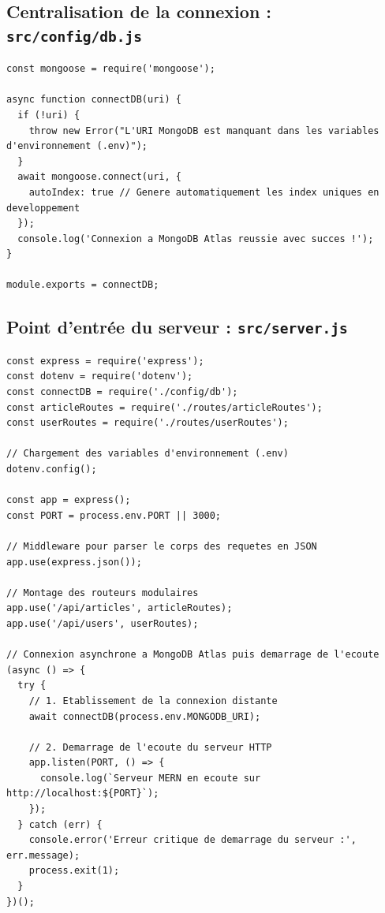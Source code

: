\documentclass[12pt, a4paper]{article}
\begin{document}
\subsection{Centralisation de la connexion : \texttt{src/config/db.js}}
\begin{lstlisting}
const mongoose = require('mongoose');

async function connectDB(uri) {
  if (!uri) {
    throw new Error("L'URI MongoDB est manquant dans les variables d'environnement (.env)");
  }
  await mongoose.connect(uri, {
    autoIndex: true // Genere automatiquement les index uniques en developpement
  });
  console.log('Connexion a MongoDB Atlas reussie avec succes !');
}

module.exports = connectDB;
\end{lstlisting}

\subsection{Point d'entrée du serveur : \texttt{src/server.js}}
\begin{lstlisting}
const express = require('express');
const dotenv = require('dotenv');
const connectDB = require('./config/db');
const articleRoutes = require('./routes/articleRoutes');
const userRoutes = require('./routes/userRoutes');

// Chargement des variables d'environnement (.env)
dotenv.config();

const app = express();
const PORT = process.env.PORT || 3000;

// Middleware pour parser le corps des requetes en JSON
app.use(express.json());

// Montage des routeurs modulaires
app.use('/api/articles', articleRoutes);
app.use('/api/users', userRoutes);

// Connexion asynchrone a MongoDB Atlas puis demarrage de l'ecoute
(async () => {
  try {
    // 1. Etablissement de la connexion distante
    await connectDB(process.env.MONGODB_URI);

    // 2. Demarrage de l'ecoute du serveur HTTP
    app.listen(PORT, () => {
      console.log(`Serveur MERN en ecoute sur http://localhost:${PORT}`);
    });
  } catch (err) {
    console.error('Erreur critique de demarrage du serveur :', err.message);
    process.exit(1);
  }
})();
\end{lstlisting}
\end{document}
